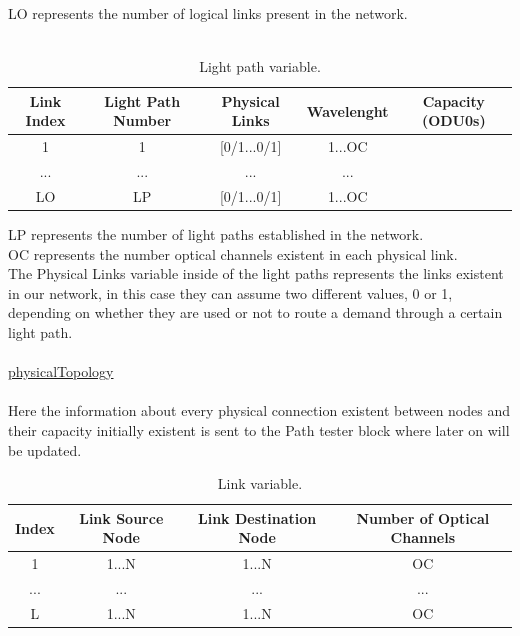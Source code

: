 LO represents the number of logical links present in the network.\\ \\
\begin{table}[H]
	\centering
	\begin{tabular}{|c|c|c|c|c|}
		\hline
		Link Index & Light Path Number & Physical Links  & Wavelenght & Capacity (ODU0s) \\ \hline
		1          & 1                 & {[}0/1...0/1{]} & 1...OC     &                  \\ \hline
		...        & ...               & ...             & ...        &                  \\ \hline
		LO         & LP                & {[}0/1...0/1{]} & 1...OC     &                  \\ \hline
	\end{tabular}
	\caption{Light path variable.}
	\label{lightpath_example}
\end{table}
LP represents the number of light paths established in the network.\\
OC represents the number optical channels existent in each physical link.\\
The Physical Links variable inside of the light paths represents the links existent in our network, in this case they can assume two different values, 0 or 1, depending on whether they are used or not to route a demand through a certain light path.\\ \\
\underline{physicalTopology}\\
\\
Here the information about every physical connection existent between nodes and their capacity initially existent is sent to the Path tester block where later on will be updated.

\begin{table}[H]
	\centering
	\begin{tabular}{|c|c|c|c|}
		\hline
		Index & Link Source Node & Link Destination Node & Number of Optical Channels \\ \hline
		1     & 1...N            & 1...N                 & OC                        \\ \hline
		...   & ...              & ...                   & ...                        \\ \hline
		L     & 1...N            & 1...N                 & OC                        \\ \hline
	\end{tabular}
	\caption{Link variable.}
	\label{link_example}
\end{table}

